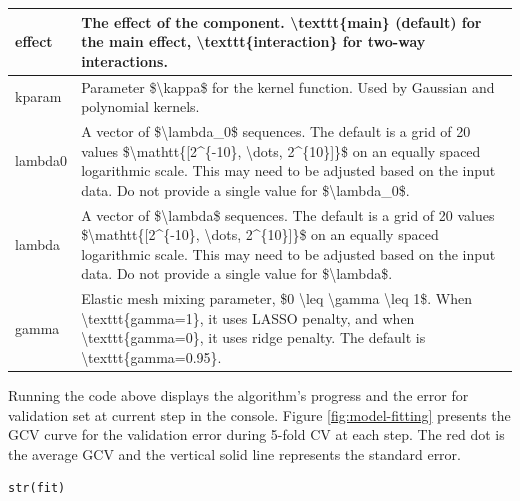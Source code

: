 \begin{table}
\begin{tabular}[t]{l|l}
\hline
effect & The effect of the component. \textbackslash{}texttt\{main\} (default) for the main effect, \textbackslash{}texttt\{interaction\} for two-way interactions.\\
\hline
kparam & Parameter \$\textbackslash{}kappa\$ for the kernel function. Used by Gaussian and polynomial kernels.\\
\hline
lambda0 & A vector of \$\textbackslash{}lambda\_0\$ sequences. The default is a grid of 20 values \$\textbackslash{}mathtt\{[2\textasciicircum{}\{-10\}, \textbackslash{}dots, 2\textasciicircum{}\{10\}]\}\$ on an equally spaced logarithmic scale. This may need to be adjusted based on the input data. Do not provide a single value for \$\textbackslash{}lambda\_0\$.\\
\hline
lambda & A vector of \$\textbackslash{}lambda\$ sequences. The default is a grid of 20 values \$\textbackslash{}mathtt\{[2\textasciicircum{}\{-10\}, \textbackslash{}dots, 2\textasciicircum{}\{10\}]\}\$ on an equally spaced logarithmic scale. This may need to be adjusted based on the input data. Do not provide a single value for \$\textbackslash{}lambda\$.\\
\hline
gamma & Elastic mesh mixing parameter, \$0 \textbackslash{}leq \textbackslash{}gamma \textbackslash{}leq 1\$. When \textbackslash{}texttt\{gamma=1\}, it uses LASSO penalty, and when \textbackslash{}texttt\{gamma=0\}, it uses ridge penalty. The default is \textbackslash{}texttt\{gamma=0.95\}.\\
\hline
\end{tabular}
\end{table}

Running the code above displays the algorithm's progress and the error for validation set at current step in the console. Figure \ref{fig:model-fitting} presents the GCV curve for the validation error during 5-fold CV at each step. The red dot is the average GCV and the vertical solid line represents the standard error.

\begin{verbatim}
str(fit)
\end{verbatim}

